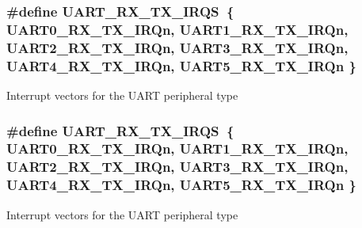 \subsubsection[{\texorpdfstring{U\+A\+R\+T\+\_\+\+R\+X\+\_\+\+T\+X\+\_\+\+I\+R\+QS}{UART_RX_TX_IRQS}}]{\setlength{\rightskip}{0pt plus 5cm}\#define U\+A\+R\+T\+\_\+\+R\+X\+\_\+\+T\+X\+\_\+\+I\+R\+QS~\{ {\bf U\+A\+R\+T0\+\_\+\+R\+X\+\_\+\+T\+X\+\_\+\+I\+R\+Qn}, {\bf U\+A\+R\+T1\+\_\+\+R\+X\+\_\+\+T\+X\+\_\+\+I\+R\+Qn}, {\bf U\+A\+R\+T2\+\_\+\+R\+X\+\_\+\+T\+X\+\_\+\+I\+R\+Qn}, {\bf U\+A\+R\+T3\+\_\+\+R\+X\+\_\+\+T\+X\+\_\+\+I\+R\+Qn}, {\bf U\+A\+R\+T4\+\_\+\+R\+X\+\_\+\+T\+X\+\_\+\+I\+R\+Qn}, {\bf U\+A\+R\+T5\+\_\+\+R\+X\+\_\+\+T\+X\+\_\+\+I\+R\+Qn} \}}\hypertarget{group__UART__Peripheral__Access__Layer_ga84932f7830684ae87059a8343f90095b}{}\label{group__UART__Peripheral__Access__Layer_ga84932f7830684ae87059a8343f90095b}
Interrupt vectors for the U\+A\+RT peripheral type 
\subsubsection[{\texorpdfstring{U\+A\+R\+T\+\_\+\+R\+X\+\_\+\+T\+X\+\_\+\+I\+R\+QS}{UART_RX_TX_IRQS}}]{\setlength{\rightskip}{0pt plus 5cm}\#define U\+A\+R\+T\+\_\+\+R\+X\+\_\+\+T\+X\+\_\+\+I\+R\+QS~\{ {\bf U\+A\+R\+T0\+\_\+\+R\+X\+\_\+\+T\+X\+\_\+\+I\+R\+Qn}, {\bf U\+A\+R\+T1\+\_\+\+R\+X\+\_\+\+T\+X\+\_\+\+I\+R\+Qn}, {\bf U\+A\+R\+T2\+\_\+\+R\+X\+\_\+\+T\+X\+\_\+\+I\+R\+Qn}, {\bf U\+A\+R\+T3\+\_\+\+R\+X\+\_\+\+T\+X\+\_\+\+I\+R\+Qn}, {\bf U\+A\+R\+T4\+\_\+\+R\+X\+\_\+\+T\+X\+\_\+\+I\+R\+Qn}, {\bf U\+A\+R\+T5\+\_\+\+R\+X\+\_\+\+T\+X\+\_\+\+I\+R\+Qn} \}}\hypertarget{group__UART__Peripheral__Access__Layer_ga84932f7830684ae87059a8343f90095b}{}\label{group__UART__Peripheral__Access__Layer_ga84932f7830684ae87059a8343f90095b}
Interrupt vectors for the U\+A\+RT peripheral type 